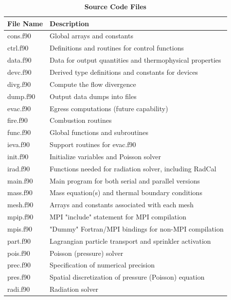 \documentclass[11pt]{book}
\begin{document}
\begin{table}[ht]
\begin{center}
\caption{\bf Source Code Files}
\label{tab:sourcefiles}
\vspace{.1in}
\begin{tabular}{|l|l|}
\hline
File Name  & Description  \\ \hline \hline
cons.f90   & Global arrays and constants \\ \hline
ctrl.f90   & Definitions and routines for control functions \\ \hline
data.f90   & Data for output quantities and thermophysical properties\\ \hline
devc.f90   & Derived type definitions and constants for devices \\ \hline
divg.f90   & Compute the flow divergence \\ \hline
dump.f90   & Output data dumps into files \\ \hline
evac.f90   & Egress computations (future capability) \\ \hline
fire.f90   & Combustion routines \\ \hline
func.f90   & Global functions and subroutines \\ \hline
ieva.f90   & Support routines for evac.f90 \\ \hline
init.f90   & Initialize variables and Poisson solver \\ \hline
irad.f90   & Functions needed for radiation solver, including RadCal \\ \hline
main.f90   & Main program for both serial and parallel versions \\ \hline
mass.f90   & Mass equation(s) and thermal boundary conditions \\ \hline
mesh.f90   & Arrays and constants associated with each mesh \\ \hline
mpip.f90   & MPI "include" statement for MPI compilation \\ \hline
mpis.f90   & "Dummy" Fortran/MPI bindings for non-MPI compilation \\ \hline
part.f90   & Lagrangian particle transport and sprinkler activation \\ \hline
pois.f90   & Poisson (pressure) solver \\ \hline
prec.f90   & Specification of numerical precision \\ \hline
pres.f90   & Spatial discretization of pressure (Poisson) equation \\ \hline
radi.f90   & Radiation solver  \\ \hline

\end{tabular}
\end{center}
\end{table}
\end{document}
